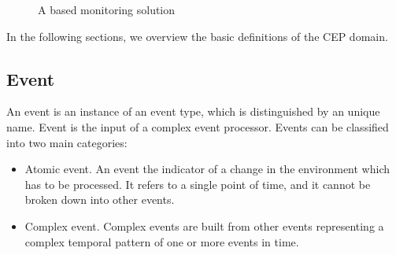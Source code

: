 \begin{figure}
	\centering
	\caption{A \cep{} based monitoring solution}
\label{fig:cep_monitoring}
\end{figure}

\noindent In the following sections, we overview the basic definitions of the CEP domain.

\subsection{Event}
\label{subsec:cep_event}

An event is an instance of an event type, which is distinguished by an unique name.
Event is the input of a complex event processor. Events can be classified into two main categories:
\begin{itemize}
	\item Atomic event. An event the indicator of a change in the environment which has to be processed. It refers to a single point of time, and it cannot be broken down into other events.
	\item Complex event. Complex events are built from other events representing a complex temporal pattern of one or more events in time.
\end{itemize}

\needspace{10em}
